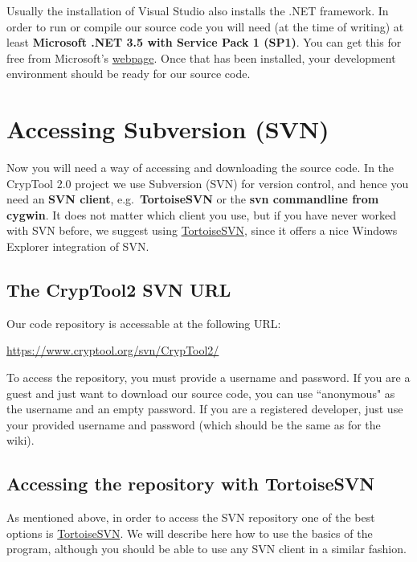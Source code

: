 Usually the installation of Visual Studio also installs the .NET framework. In order to run or compile our source code you will need (at the time of writing) at least \textbf{Microsoft .NET 3.5 with Service Pack 1 (SP1)}. You can get this for free from Microsoft's \href{http://download.microsoft.com/download/2/0/e/20e90413-712f-438c-988e-fdaa79a8ac3d/dotnetfx35.exe}{webpage}. Once that has been installed, your development environment should be ready for our source code.

\section{Accessing Subversion (SVN)}
\label{AccessingSubversion}

Now you will need a way of accessing and downloading the source code. In the CrypTool 2.0 project we use Subversion (SVN) for version control, and hence you need an \textbf{SVN client}, e.g.\ \textbf{TortoiseSVN} or the \textbf{svn commandline from cygwin}. It does not matter which client you use, but if you have never worked with SVN before, we suggest using \href{http://www.tortoisesvn.net/}{TortoiseSVN}, since it offers a nice Windows Explorer integration of SVN.
\clearpage

\subsection*{The CrypTool2 SVN URL}
\label{TheCrypTool2SVNURL}

Our code repository is accessable at the following URL:

\url{https://www.cryptool.org/svn/CrypTool2/}

To access the repository, you must provide a username and password. If you are a guest and just want to download our source code, you can use ``anonymous" as the username and an empty password. If you are a registered developer, just use your provided username and password (which should be the same as for the wiki).

\subsection*{Accessing the repository with TortoiseSVN}
\label{AccessingTheRepositoryWithTortoiseSVN}

As mentioned above, in order to access the SVN repository one of the best options is \href{http://www.tortoisesvn.net/}{TortoiseSVN}. We will describe here how to use the basics of the program, although you should be able to use any SVN client in a similar fashion.


